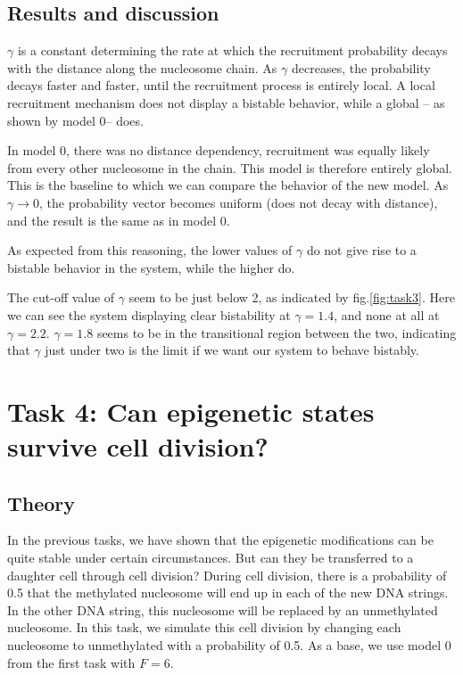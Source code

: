 \documentclass[fleqn,10pt]{SelfArx} %
\begin{document}
\subsection{Results and discussion}



$\gamma$ is a constant determining the rate at which the recruitment probability decays with the distance along the nucleosome chain. As $\gamma$ decreases, the probability decays faster and faster, until the recruitment process is entirely local. A local recruitment mechanism does not display a bistable behavior, while a global -- as shown by model 0-- does. 

In model 0, there was no distance dependency, recruitment was equally likely from every other nucleosome in the chain. This model is therefore entirely global. 
This is the baseline to which we can compare the behavior of the new model. 
As $\gamma\to 0$, the probability vector becomes uniform (does not decay with distance), and the result is the same as in model 0.

As expected from this reasoning, the lower values of $\gamma$ do not give rise to a bistable behavior in the system, while the higher do. 

The cut-off value of $\gamma$ seem to be just below 2, as indicated by fig.\eqref{fig:task3}. 
Here we can see the system displaying clear bistability at $\gamma = 1.4$, and none at all at $\gamma= 2.2$. $\gamma= 1.8$ seems to be in the transitional region between the two, indicating that $\gamma$ just under two is the limit if we want our system to behave bistably. 








\section{Task 4: Can epigenetic states survive cell division?}
\subsection{Theory}
In the previous tasks, we have shown that the epigenetic modifications can be quite stable under certain circumstances. But can they be transferred to a daughter cell through cell division?
During cell division, there is a probability of 0.5 that the methylated nucleosome will end up in each of the new DNA strings. In the other DNA string, this nucleosome will be replaced by an unmethylated nucleosome. 
In this task, we simulate this cell division by changing each nucleosome to unmethylated with a probability of 0.5.
As a base, we use model 0 from the first task with $F=6$.
\end{document}
